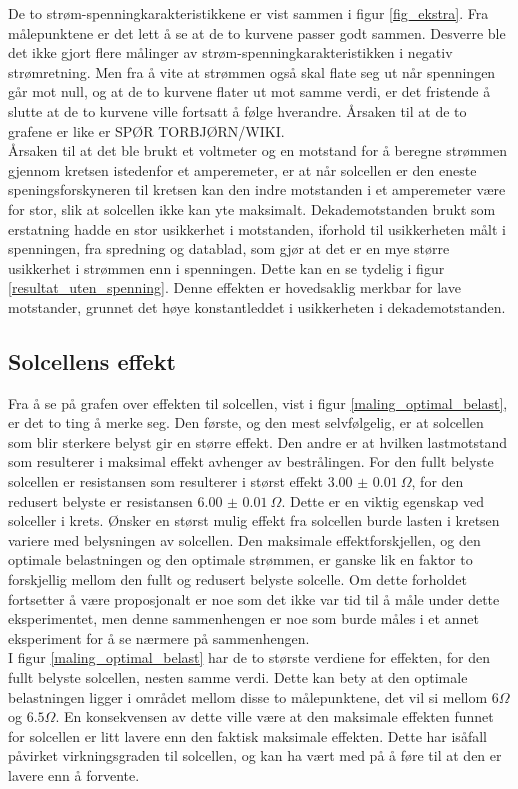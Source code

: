 \documentclass[%
 reprint,
 amsmath,amssymb,
 aps,
 norsk,
 booktabs
]{revtex4-1}
\begin{document}
\par
De to strøm-spenningkarakteristikkene er vist sammen i figur \vref{fig_ekstra}. Fra målepunktene er det lett å se at de to kurvene passer godt sammen. Desverre ble det ikke gjort flere målinger av strøm-spenningkarakteristikken i negativ strømretning. Men fra å vite at strømmen også skal flate seg ut når spenningen går mot null, og at de to kurvene flater ut mot samme verdi, er det fristende å slutte at de to kurvene ville fortsatt å følge hverandre. Årsaken til at de to grafene er like er SPØR TORBJØRN/WIKI.\\
Årsaken til at det ble brukt et voltmeter og en motstand for å beregne strømmen gjennom kretsen istedenfor et amperemeter, er at når solcellen er den eneste speningsforskyneren til kretsen kan den indre motstanden i et amperemeter være for stor, slik at solcellen ikke kan yte maksimalt. Dekademotstanden brukt som erstatning hadde en stor usikkerhet i motstanden, iforhold til usikkerheten målt i spenningen, fra spredning og datablad, som gjør at det er en mye større usikkerhet i strømmen enn i spenningen. Dette kan en se tydelig i figur \vref{resultat_uten_spenning}. Denne effekten er hovedsaklig merkbar for lave motstander, grunnet det høye konstantleddet i usikkerheten i dekademotstanden.
\subsection{Solcellens effekt}
Fra å se på grafen over effekten til solcellen, vist i figur \vref{maling_optimal_belast}, er det to ting å merke seg. Den første, og den mest selvfølgelig, er at solcellen som blir sterkere belyst gir en større effekt. Den andre er at hvilken lastmotstand som resulterer i maksimal effekt avhenger av bestrålingen. For den fullt belyste solcellen er resistansen som resulterer i størst effekt $\SI{3.00(1)}{\Omega}$, for den redusert belyste er resistansen $\SI{6.00(1)}{\Omega}$. Dette er en viktig egenskap ved solceller i krets. Ønsker en størst mulig effekt fra solcellen burde lasten i kretsen variere med belysningen av solcellen. Den maksimale effektforskjellen, og den optimale belastningen og den optimale strømmen, er ganske lik en faktor to forskjellig mellom den fullt og redusert belyste solcelle. Om dette forholdet fortsetter å være proposjonalt er noe som det ikke var tid til å måle under dette eksperimentet, men denne sammenhengen er noe som burde måles i et annet eksperiment for å se nærmere på sammenhengen.\\ I figur \vref{maling_optimal_belast} har de to største verdiene for effekten, for den fullt belyste solcellen, nesten samme verdi. Dette kan bety at den optimale belastningen ligger i området mellom disse to målepunktene, det vil si mellom $6\Omega$ og $6.5\Omega$. En konsekvensen av dette ville være at den maksimale effekten funnet for solcellen er litt lavere enn den faktisk maksimale effekten. Dette har isåfall påvirket virkningsgraden til solcellen, og kan ha vært med på å føre til at den er lavere enn å forvente.
\end{document}
